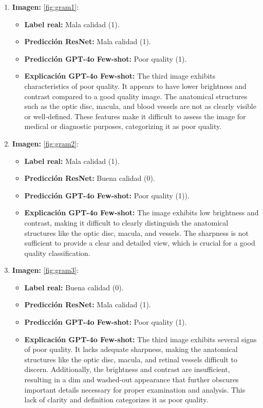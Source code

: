 \begin{enumerate}
	\item \textbf{Imagen:} \ref{fig:gram1}:
	\begin{itemize}
		\item \textbf{Label real:} Mala calidad (1).
		\item \textbf{Predicción ResNet:} Mala calidad (1).
		\item \textbf{Predicción GPT-4o Few-shot:} Poor quality (1).
		\item \textbf{Explicación GPT-4o Few-shot:} The third image exhibits characteristics of poor quality. It appears to have lower brightness and contrast compared to a good quality image. The anatomical structures such as the optic disc, macula, and blood vessels are not as clearly visible or well-defined. These features make it difficult to assess the image for medical or diagnostic purposes, categorizing it as poor quality.
	\end{itemize}
	\item \textbf{Imagen:} \ref{fig:gram2}:
	\begin{itemize}
		\item \textbf{Label real:} Mala calidad (1).
		\item \textbf{Predicción ResNet:} Buena calidad (0).
		\item \textbf{Predicción GPT-4o Few-shot:} Poor quality (1)).
		\item \textbf{Explicación GPT-4o Few-shot:} The image exhibits low brightness and contrast, making it difficult to clearly distinguish the anatomical structures like the optic disc, macula, and vessels. The sharpness is not sufficient to provide a clear and detailed view, which is crucial for a good quality classification.
	\end{itemize}
	\item \textbf{Imagen:} \ref{fig:gram3}:
	\begin{itemize}
		\item \textbf{Label real:} Buena calidad (0).
		\item \textbf{Predicción ResNet:} Mala calidad (1).
		\item \textbf{Predicción GPT-4o Few-shot:} Poor quality (1).
		\item \textbf{Explicación GPT-4o Few-shot:} The third image exhibits several signs of poor quality. It lacks adequate sharpness, making the anatomical structures like the optic disc, macula, and retinal vessels difficult to discern. Additionally, the brightness and contrast are insufficient, resulting in a dim and washed-out appearance that further obscures important details necessary for proper examination and analysis. This lack of clarity and definition categorizes it as poor quality.
	\end{itemize}
\end{enumerate}

